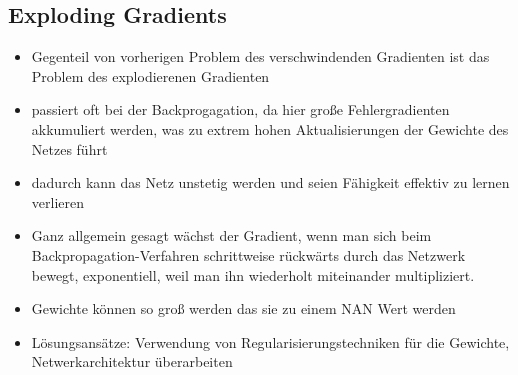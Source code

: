 \subsection{Exploding Gradients}
\begin{itemize}
    \item Gegenteil von vorherigen Problem des verschwindenden Gradienten ist das Problem des explodierenen Gradienten
    \item passiert oft bei der Backprogagation, da hier große Fehlergradienten akkumuliert werden, was zu extrem hohen Aktualisierungen der Gewichte des Netzes führt
    \item dadurch kann das Netz unstetig werden und seien Fähigkeit effektiv zu lernen verlieren
    \item Ganz allgemein gesagt wächst der Gradient, wenn man sich beim Backpropagation-Verfahren schrittweise rückwärts durch das Netzwerk bewegt, exponentiell, weil man ihn wiederholt miteinander multipliziert.
    \item Gewichte können so groß werden das sie zu einem NAN Wert werden
    \item Lösungsansätze: Verwendung von Regularisierungstechniken für die Gewichte, Netwerkarchitektur überarbeiten
\end{itemize}
